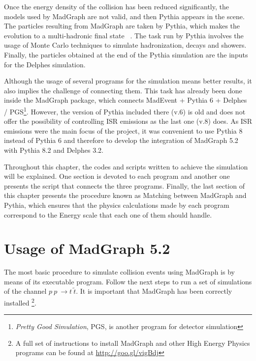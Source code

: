 \documentclass[12pt, oneside]{book}              %
\begin{document}
Once the energy density of the collision has been reduced significantly, the models used
by MadGraph are not valid, and then Pythia appears in the scene. The particles resulting
from MadGraph are taken by Pythia, which makes the evolution to a multi-hadronic final
state ~\cite{Sjostrand:2014zea}. The task run by Pythia involves the usage of Monte
Carlo techniques to simulate hadronization, decays and showers. Finally, the particles
obtained at the end of the Pythia simulation are the inputs for the Delphes simulation.

Although the usage of several programs for the simulation means better results, it also
implies the challenge of connecting them. This task has already been done inside the MadGraph
package, which connects MadEvent + Pythia 6 + Delphes / PGS\footnote{\textit{Pretty 
Good Simulation}, PGS, is another program for detector simulation}. However, the version
of Pythia included there (v.6) is old and does not offer the possibility of controlling 
ISR emissions as the last one (v.8) does. As ISR emissions were the main focus of the 
project, it was convenient to use Pythia 8 instead of Pythia 6 and therefore to develop
the integration of MadGraph 5.2 with Pythia 8.2 and Delphes 3.2.

Throughout this chapter, the codes and scripts written to achieve the simulation will
be explained. One section is devoted to each program and another one presents the
script that connects the three programs. Finally, the last section of this chapter
presents the procedure known as Matching between MadGraph and Pythia, which ensures that
the physics calculations made by each program correspond to the Energy scale that
each one of them should handle.

\section{Usage of MadGraph 5.2} \label{sec:MadGraph}

The most basic procedure to simulate collision events using MadGraph is by means of its
executable program. Follow the next steps to run a set of simulations of the channel
$ p\ p\ \to t\ \tilde{t} $. It is important that MadGraph has been correctly installed
\footnote{A full set of instructions to install MadGraph and other High Energy Physics
programs can be found at \url{http://goo.gl/vigBdj}}.
\end{document}
